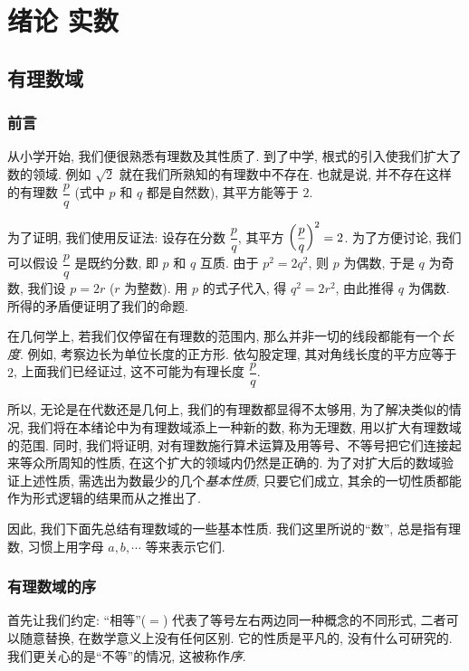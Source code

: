 \chapter*{\texorpdfstring{绪论 \quad 实数}{绪论 实数}}

\section{有理数域}

\subsection{前言} \label{subsec:1}

从小学开始, 我们便很熟悉有理数及其性质了.
到了中学, 根式的引入使我们扩大了数的领域.
例如 $\sqrt{2}$ 就在我们所熟知的有理数中不存在.
也就是说, {\kaishu 并不存在这样的有理数 $\dfrac{p}{q}$ (式中 $p$ 和 $q$ 都是自然数),
其平方能等于 $2$}.

为了证明, 我们使用反证法:
设存在分数 $\dfrac{p}{q}$, 其平方 $\left( \dfrac{p}{q} \right)^2 = 2$.
为了方便讨论, 我们可以假设 $\dfrac{p}{q}$ 是既约分数, 即 $p$ 和 $q$ 互质.
由于 $p^2 = 2q^2$, 则 $p$ 为偶数, 于是 $q$ 为奇数, 我们设 $p = 2r$ ($r$ 为整数).
用 $p$ 的式子代入, 得 $q^2 = 2r^2$, 由此推得 $q$ 为偶数.
所得的矛盾便证明了我们的命题.

在几何学上, 若我们仅停留在有理数的范围内, 那么并非一切的线段都能有一个\emph{长度}.
例如, 考察边长为单位长度的正方形.
依勾股定理, 其对角线长度的平方应等于 $2$, 上面我们已经证过, 这不可能为有理长度 $\dfrac{p}{q}$.

所以, 无论是在代数还是几何上, 我们的有理数都显得不太够用,
为了解决类似的情况, 我们将在本绪论中为有理数域添上一种新的数,
称为无理数, 用以扩大有理数域的范围.
同时, 我们将证明, 对有理数施行算术运算及用等号、不等号把它们连接起来等众所周知的性质,
在这个扩大的领域内仍然是正确的.
为了对扩大后的数域验证上述性质, 需选出为数最少的几个\emph{基本性质},
只要它们成立, 其余的一切性质都能作为形式逻辑的结果而从之推出了.

因此, 我们下面先总结有理数域的一些基本性质.
我们这里所说的“数”, 总是指有理数, 习惯上用字母 $a, b, \cdots$ 等来表示它们.

\subsection{有理数域的序} \label{subsec:2}

首先让我们约定: “相等”($=$) 代表了等号左右两边同一种概念的不同形式,
二者可以随意替换, 在数学意义上没有任何区别.
它的性质是平凡的, 没有什么可研究的.
我们更关心的是“不等”的情况, 这被称作\emph{序}.

